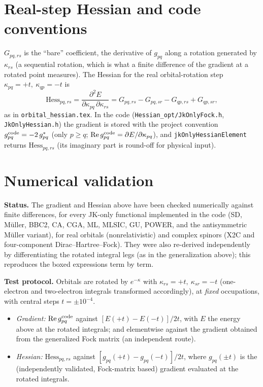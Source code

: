 \documentclass[11pt]{article}
\begin{document}
\section*{Real-step Hessian and code conventions}

$G_{pq,rs}$ is the ``bare'' coefficient, the derivative of $g_{pq}$ along a
rotation generated by $\kappa_{rs}$ (a sequential rotation, which is what a
finite difference of the gradient at a rotated point measures). The Hessian for
the real orbital-rotation step $\kappa_{pq}=+t,\ \kappa_{qp}=-t$ is
\begin{equation}
\mathrm{Hess}_{pq,rs}=\frac{\partial^2E}{\partial\kappa_{pq}\,\partial\kappa_{rs}}
= G_{pq,rs}-G_{pq,sr}-G_{qp,rs}+G_{qp,sr},
\end{equation}
as in \texttt{orbital\_hessian.tex}. In the code
(\texttt{Hessian\_opt/JkOnlyFock.h}, \texttt{JkOnlyHessian.h}) the gradient is
stored with the project convention $g^{\rm code}_{pq}=-2\,g^{*}_{pq}$ (only
$p\ge q$; $\mathrm{Re}\,g^{\rm code}_{pq}=\partial E/\partial\kappa_{pq}$), and
\texttt{jkOnlyHessianElement} returns $\mathrm{Hess}_{pq,rs}$ (its imaginary part
is round-off for physical input).

\section*{Numerical validation}

\noindent\textbf{Status.} The gradient and Hessian above have been checked
numerically against finite differences, for every JK-only functional
implemented in the code (SD, M\"uller, BBC2, CA, CGA, ML, MLSIC, GU, POWER, and the
antisymmetric M\"uller variant), for real orbitals (nonrelativistic) and complex
spinors (X2C and four-component Dirac--Hartree--Fock). They were also re-derived
independently by differentiating the rotated integral legs (as in the
generalization above); this reproduces the boxed expressions term by term.

\medskip
\noindent\textbf{Test protocol.} Orbitals are rotated by $e^{-\kappa}$ with
$\kappa_{rs}=+t,\ \kappa_{sr}=-t$ (one-electron and two-electron integrals
transformed accordingly), at \emph{fixed} occupations, with central steps
$t=\pm10^{-4}$.
\begin{itemize}
\item \emph{Gradient:} $\mathrm{Re}\,g^{\rm code}_{pq}$ against
$[E(+t)-E(-t)]/2t$, with $E$ the energy above at the rotated integrals; and
elementwise against the gradient obtained from the generalized Fock matrix
(an independent route).
\item \emph{Hessian:} $\mathrm{Hess}_{pq,rs}$ against
$[g_{pq}(+t)-g_{pq}(-t)]/2t$, where $g_{pq}(\pm t)$ is the (independently
validated, Fock-matrix based) gradient evaluated at the rotated integrals.
\end{itemize}
\end{document}
